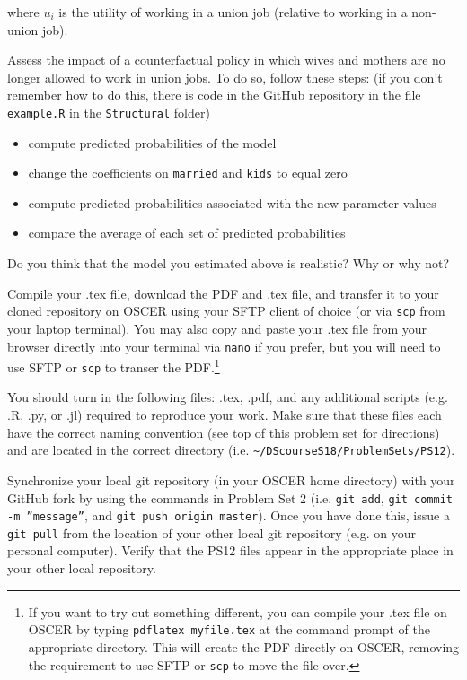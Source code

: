 \documentclass[12pt,english]{exam}
\begin{document}
\begin{questions}
where $u_{i}$ is the utility of working in a union job (relative to working in a non-union job).

\question Assess the impact of a counterfactual policy in which wives and mothers are no longer allowed to work in union jobs. To do so, follow these steps: (if you don't remember how to do this, there is code in the GitHub repository in the file \texttt{example.R} in the \texttt{Structural} folder)
\begin{itemize}
    \item compute predicted probabilities of the model
    \item change the coefficients on \texttt{married} and \texttt{kids} to equal zero
    \item compute predicted probabilities associated with the new parameter values
    \item compare the average of each set of predicted probabilities
\end{itemize}

Do you think that the model you estimated above is realistic? Why or why not?

\question Compile your .tex file, download the PDF and .tex file, and transfer it to your cloned repository on OSCER using your SFTP client of choice (or via \texttt{scp} from your laptop terminal). You may also copy and paste your .tex file from your browser directly into your terminal via \texttt{nano} if you prefer, but you will need to use SFTP or \texttt{scp} to transer the PDF.\footnote{If you want to try out something different, you can compile your .tex file on OSCER by typing \texttt{pdflatex myfile.tex} at the command prompt of the appropriate directory. This will create the PDF directly on OSCER, removing the requirement to use SFTP or \texttt{scp} to move the file over.}

\question You should turn in the following files: .tex, .pdf, and any additional scripts (e.g. .R, .py, or .jl) required to reproduce your work.  Make sure that these files each have the correct naming convention (see top of this problem set for directions) and are located in the correct directory (i.e. \texttt{\textasciitilde/DScourseS18/ProblemSets/PS12}).

\question Synchronize your local git repository (in your OSCER home directory) with your GitHub fork by using the commands in Problem Set 2 (i.e. \texttt{git add}, \texttt{git commit -m ''message''}, and \texttt{git push origin master}). Once you have done this, issue a \texttt{git pull} from the location of your other local git repository (e.g. on your personal computer). Verify that the PS12 files appear in the appropriate place in your other local repository.

\end{questions}
\end{document}
